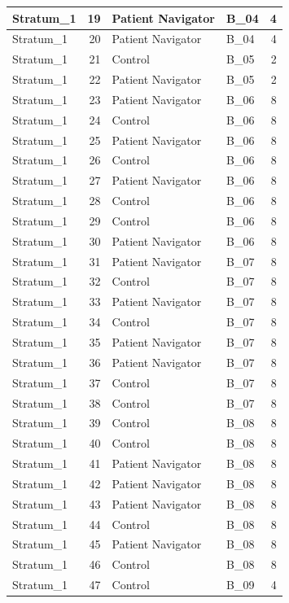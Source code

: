 \documentclass[
]{book}
\begin{document}
\begin{table}[H]
\begin{tabular}{l|r|l|l|r}
\hline
Stratum\_1 & 19 & Patient Navigator & B\_04 & 4\\
\hline
Stratum\_1 & 20 & Patient Navigator & B\_04 & 4\\
\hline
Stratum\_1 & 21 & Control & B\_05 & 2\\
\hline
Stratum\_1 & 22 & Patient Navigator & B\_05 & 2\\
\hline
Stratum\_1 & 23 & Patient Navigator & B\_06 & 8\\
\hline
Stratum\_1 & 24 & Control & B\_06 & 8\\
\hline
Stratum\_1 & 25 & Patient Navigator & B\_06 & 8\\
\hline
Stratum\_1 & 26 & Control & B\_06 & 8\\
\hline
Stratum\_1 & 27 & Patient Navigator & B\_06 & 8\\
\hline
Stratum\_1 & 28 & Control & B\_06 & 8\\
\hline
Stratum\_1 & 29 & Control & B\_06 & 8\\
\hline
Stratum\_1 & 30 & Patient Navigator & B\_06 & 8\\
\hline
Stratum\_1 & 31 & Patient Navigator & B\_07 & 8\\
\hline
Stratum\_1 & 32 & Control & B\_07 & 8\\
\hline
Stratum\_1 & 33 & Patient Navigator & B\_07 & 8\\
\hline
Stratum\_1 & 34 & Control & B\_07 & 8\\
\hline
Stratum\_1 & 35 & Patient Navigator & B\_07 & 8\\
\hline
Stratum\_1 & 36 & Patient Navigator & B\_07 & 8\\
\hline
Stratum\_1 & 37 & Control & B\_07 & 8\\
\hline
Stratum\_1 & 38 & Control & B\_07 & 8\\
\hline
Stratum\_1 & 39 & Control & B\_08 & 8\\
\hline
Stratum\_1 & 40 & Control & B\_08 & 8\\
\hline
Stratum\_1 & 41 & Patient Navigator & B\_08 & 8\\
\hline
Stratum\_1 & 42 & Patient Navigator & B\_08 & 8\\
\hline
Stratum\_1 & 43 & Patient Navigator & B\_08 & 8\\
\hline
Stratum\_1 & 44 & Control & B\_08 & 8\\
\hline
Stratum\_1 & 45 & Patient Navigator & B\_08 & 8\\
\hline
Stratum\_1 & 46 & Control & B\_08 & 8\\
\hline
Stratum\_1 & 47 & Control & B\_09 & 4\\

\end{tabular}
\end{table}
\end{document}

